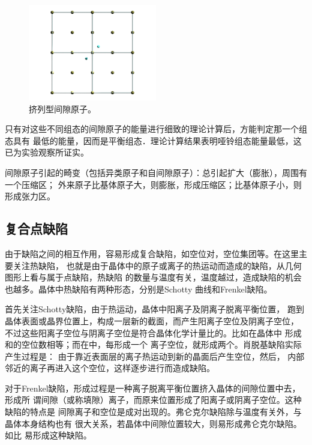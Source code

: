             \begin{figure}[ht]
                \centering
                \includegraphics[width=0.5\textwidth]{fig/interstitial_in_fcc_3.png}
                \caption{挤列型间隙原子。}
                \label{挤列型间隙原子}
            \end{figure}
            
            只有对这些不同组态的间隙原子的能量进行细致的理论计算后，方能判定那一个组态具有
            最低的能量，因而是平衡组态．理论计算结果表明哑铃组态能量最低，这已为实验观察所证实。

            间隙原子引起的畸变（包括异类原子和自间隙原子）：总引起扩大（膨胀），周围有一个压缩区；
            外来原子比基体原子大，则膨胀，形成压缩区；比基体原子小，则形成张力区。

        \subsection{复合点缺陷}
            由于缺陷之间的相互作用，容易形成复合缺陷，如空位对，空位集团等。在这里主要关注热缺陷，
            也就是由于晶体中的原子或离子的热运动而造成的缺陷，从几何图形上看与属于点缺陷，热缺陷
            的数量与温度有关，温度越过，造成缺陷的机会也越多。晶体中热缺陷有两种形态，分别是Schotty
            曲线和Frenkel缺陷。

            首先关注Schotty缺陷，由于热运动，晶体中阳离子及阴离子脱离平衡位置，
            跑到晶体表面或晶界位置上，构成一层新的截面，而产生阳离子空位及阴离子空位，
            不过这些阳离子空位与阴离子空位是符合晶体化学计量比的。比如在晶体中
            形成和的空位数相等；而在中，每形成一个
            离子空位，就形成两个。肖脱基缺陷实际产生过程是：
            由于靠近表面层的离子热运动到新的晶面后产生空位，然后，
            内部邻近的离子再进入这个空位，这样逐步进行而造成缺陷。

            对于Frenkel缺陷，形成过程是一种离子脱离平衡位置挤入晶体的间隙位置中去，形成所
            谓间隙（或称填隙）离子，而原来位置形成了阳离子或阴离子空位。这种缺陷的特点是
            间隙离子和空位是成对出现的。弗仑克尔缺陷除与温度有关外，与晶体本身结构也有
            很大关系，若晶体中间隙位置较大，则易形成弗仑克尔缺陷。如比
            易形成这种缺陷。
